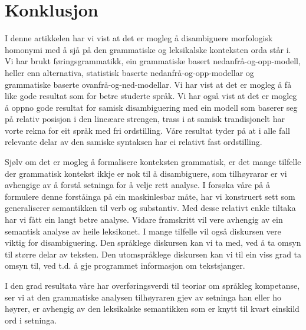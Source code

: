 \documentclass[a4paper,norsk]{article}
\begin{document}
\section{Konklusjon}

I denne artikkelen har vi vist at det er mogleg å disambiguere morfologisk homonymi med å sjå på den grammatiske og leksikalske konteksten orda står i. Vi har brukt føringsgrammatikk, ein grammatiske basert nedanfrå-og-opp-modell, heller enn alternativa, statistisk baserte nedanfrå-og-opp-modellar og grammatiske baserte ovanfrå-og-ned-modellar. Vi har vist at det er mogleg å få like gode resultat som for betre studerte språk. Vi har også vist at det er mogleg å oppno gode resultat for samisk disambiguering med ein modell som baserer seg på relativ posisjon i den lineæare strengen, trass i at samisk trandisjonelt har vorte rekna for eit språk med fri ordstilling. Våre resultat tyder på at i alle fall relevante delar av den samiske syntaksen har ei relativt fast ordstilling.  %

Sjølv om det er mogleg å formalisere konteksten grammatisk, er det mange tilfelle der grammatisk kontekst ikkje er nok til å disambiguere, som tilhøyrarar er vi avhengige av å forstå setninga for å velje rett analyse. I forsøka våre på å formulere denne forståinga på ein maskinlesbar måte, har vi konstruert sett som generaliserer semantikken til verb og substantiv. Med desse relativt enkle tiltaka har vi fått ein langt betre analyse. Vidare framskritt vil vere avhengig av ein semantisk analyse av heile leksikonet. I mange tilfelle vil også diskursen vere viktig for disambiguering. Den språklege diskursen kan vi ta med, ved å ta omsyn til større delar av teksten. Den utomspråklege diskursen kan vi til ein viss grad ta omsyn til, ved t.d. å gje programmet informasjon om tekstsjanger. %

I den grad resultata våre har overføringsverdi til teoriar om språkleg kompetanse, ser vi at den grammatiske analysen tilhøyraren gjev av setninga han eller ho høyrer, er avhengig av den leksikalske semantikken som er knytt til kvart einskild ord i setninga. %





\end{document}
